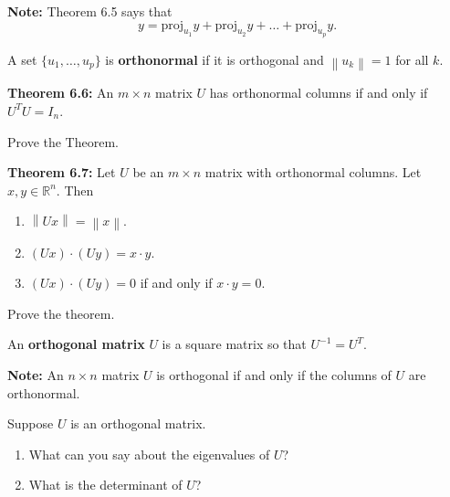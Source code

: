 \documentclass[12pt,letterpaper]{article}
\newcommand{\norm}[1]{\left\lVert#1\right\rVert}
\begin{document}
\begin{enumerate}
\vfill

{\bf Note:} Theorem 6.5 says that $$y=\text{proj}_{u_1}{y}+\text{proj}_{u_2}{y}+\dots+ \text{proj}_{u_p}{y}.$$

\begin{defn} A set $\{u_1, \dots, u_p\}$ is {\bf orthonormal} if it is orthogonal and $\norm{u_k}=1$ for all $k$.
\end{defn}

{\bf Theorem 6.6:} An $m\times n$ matrix $U$ has orthonormal columns if and only if $U^{T}U=I_n$.

\Problem Prove the Theorem.

\vfill

\newpage

{\bf Theorem 6.7:} Let $U$ be an $m\times n$ matrix with orthonormal columns. Let $x,y \in \mathbb{R}^n$. Then
\begin{enumerate}
\item $\norm{Ux}=\norm{x}$.
\item $(Ux)\cdot (Uy) = x \cdot y$.
\item $(Ux) \cdot (Uy)=0$ if and only if $x \cdot y=0$.
\end{enumerate}
\Problem Prove the theorem.

\vfill

\begin{defn} An {\bf orthogonal matrix} $U$ is a square matrix so that $U^{-1}=U^{T}$. 
\end{defn}

{\bf Note:} An $n \times n$ matrix $U$ is orthogonal if and only if the columns of $U$ are orthonormal.

\Problem Suppose $U$ is an orthogonal matrix.
\begin{enumerate}
\item  What can you say about the eigenvalues of $U$?

\vfill

\item What is the determinant of $U$?

\vfill

\end{enumerate}

\newpage



\end{enumerate}
\end{document}
